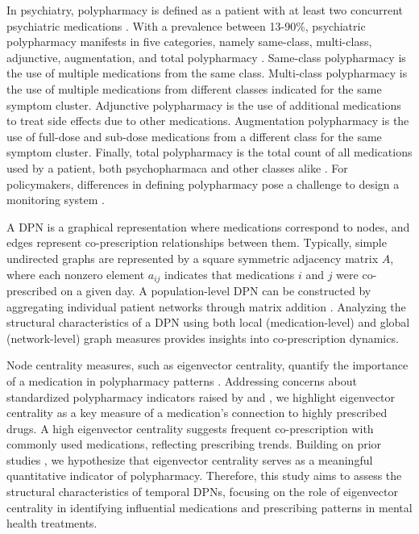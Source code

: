 \documentclass[
  authoryear,
  review]{elsarticle}
\begin{document}
In psychiatry, polypharmacy is defined as a patient with at least two
concurrent psychiatric medications \citep{Shrivastava2013}. With a
prevalence between 13-90\%, psychiatric polypharmacy manifests in five
categories, namely same-class, multi-class, adjunctive, augmentation,
and total polypharmacy \citep{Shrivastava2013}. Same-class polypharmacy
is the use of multiple medications from the same class. Multi-class
polypharmacy is the use of multiple medications from different classes
indicated for the same symptom cluster. Adjunctive polypharmacy is the
use of additional medications to treat side effects due to other
medications. Augmentation polypharmacy is the use of full-dose and
sub-dose medications from a different class for the same symptom
cluster. Finally, total polypharmacy is the total count of all
medications used by a patient, both psychopharmaca and other classes
alike \citep{Shrivastava2013}. For policymakers, differences in defining
polypharmacy pose a challenge to design a monitoring system
\citep{Sirois2016}.

A DPN is a graphical representation where medications correspond to
nodes, and edges represent co-prescription relationships between them.
Typically, simple undirected graphs are represented by a square
symmetric adjacency matrix \(A\), where each nonzero element \(a_{ij}\)
indicates that medications \(i\) and \(j\) were co-prescribed on a given
day. A population-level DPN can be constructed by aggregating individual
patient networks through matrix addition \citep{Cavallo2012}. Analyzing
the structural characteristics of a DPN using both local
(medication-level) and global (network-level) graph measures provides
insights into co-prescription dynamics.

Node centrality measures, such as eigenvector centrality, quantify the
importance of a medication in polypharmacy patterns \citep{Askar2021}.
Addressing concerns about standardized polypharmacy indicators raised by
\citet{Sirois2016} and \citet{Delara2022}, we highlight eigenvector
centrality as a key measure of a medication's connection to highly
prescribed drugs. A high eigenvector centrality suggests frequent
co-prescription with commonly used medications, reflecting prescribing
trends. Building on prior studies \citep{Cavallo2012, Bazzoni2015}, we
hypothesize that eigenvector centrality serves as a meaningful
quantitative indicator of polypharmacy. Therefore, this study aims to
assess the structural characteristics of temporal DPNs, focusing on the
role of eigenvector centrality in identifying influential medications
and prescribing patterns in mental health treatments.
\end{document}
